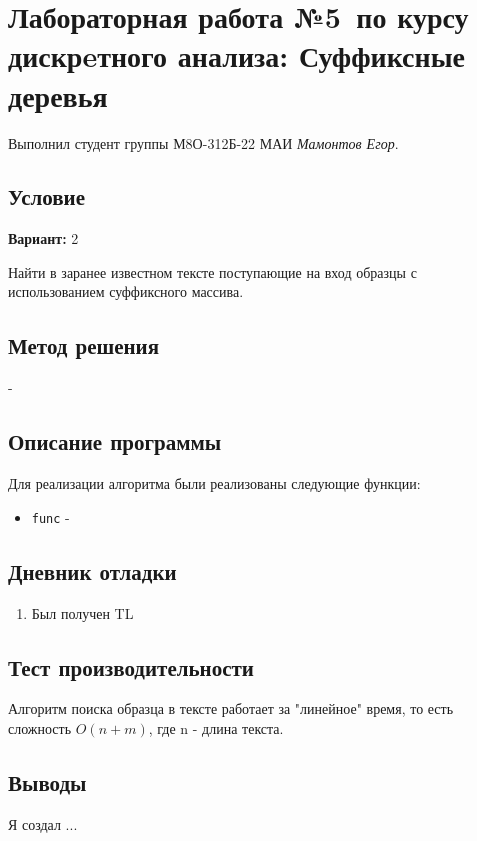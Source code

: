 \documentclass[12pt]{article}
\begin{document}
\section*{Лабораторная работа №5\, по курсу дискрeтного анализа: Суффиксные деревья}

Выполнил студент группы М8О-312Б-22 МАИ \textit{Мамонтов Егор}.

\subsection*{Условие}

\textbf{Вариант:} 2

Найти в заранее известном тексте поступающие на вход образцы с использованием суффиксного массива.

\newpage
\subsection*{Метод решения}

-
\subsection*{Описание программы}

Для реализации алгоритма были реализованы следующие функции:
\begin{itemize}
    \item \texttt{func} - 

\end{itemize}

\newpage
\subsection*{Дневник отладки}

\begin{enumerate}
    \item Был получен TL
\end{enumerate}

\newpage
\subsection*{Тест производительности}

Алгоритм поиска образца в тексте работает за "линейное" время, то есть сложность $O(n+m)$, где n - длина текста.



\newpage
\subsection*{Выводы}


Я создал ...
\end{document}
